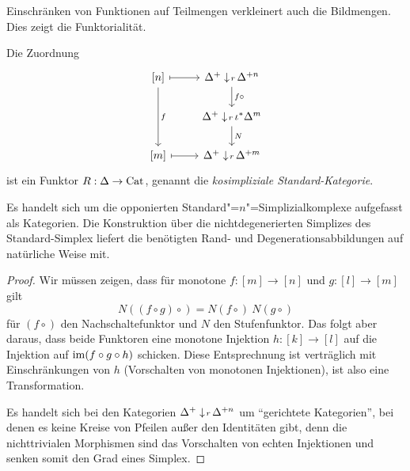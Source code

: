 Einschränken von Funktionen auf Teilmengen verkleinert auch die
Bildmengen. Dies zeigt die Funktorialität.
\begin{prop}
  Die Zuordnung
  \[ \begin{tikzcd}
    {[n]} \arrow{dd}{f} \rar[mapsto]
    & \slicecat{\Delta^+}{r}{\Delta^{+n}} \dar{f \circ} \\
    & \slicecat{\Delta^+}{r}{\iota^* \Delta^m} \dar{N} \\
    {[m]} \rar[mapsto]
    & \slicecat{\Delta^+}{r}{\Delta^{+m}}
  \end{tikzcd} \]
  ist ein Funktor $R: \Delta \to \operatorname{Cat}$, genannt die
  \emph{kosimpliziale Standard-Kategorie}.
\end{prop}
\begin{bem}
  Es handelt sich um die opponierten Standard"=$n$"=Simplizialkomplexe
  aufgefasst als Kategorien. Die Konstruktion über die
  nichtdegenerierten Simplizes des Standard-Simplex liefert die
  benötigten Rand- und Degenerationsabbildungen auf natürliche Weise
  mit.
\end{bem}
\begin{proof}
  Wir müssen zeigen, dass für monotone $f: [m] \to [n]$ und $g: [l]
  \to [m]$ gilt
  \[ N ((f \circ g)\circ) = N (f \circ) \: N (g \circ) \]
  für $(f \circ)$ den Nachschaltefunktor und $N$ den
  Stufenfunktor. Das folgt aber daraus, dass beide Funktoren eine
  monotone Injektion $h: [k] \to [l]$ auf die Injektion auf $\operatorname{im} (f
  \circ g \circ h)$ schicken. Diese Entsprechnung ist verträglich mit
  Einschränkungen von $h$ (Vorschalten von monotonen Injektionen), ist
  also eine Transformation.

  Es handelt sich bei den Kategorien
  $\Delta^+ \downarrow \! {\scriptstyle r} \, \Delta^{+n}$ um ``gerichtete Kategorien'',
  bei denen es keine Kreise von Pfeilen außer den Identitäten gibt,
  denn die nichttrivialen Morphismen sind das Vorschalten von echten
  Injektionen und senken somit den Grad eines Simplex.
\end{proof}

